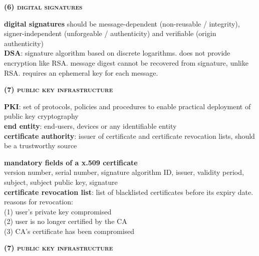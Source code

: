 \documentclass[a4paper]{article}
\begin{document}
\begin{multicols}{2}
\begin{framed}
	\begin{center}
		\textbf{\textsc{(6) digital signatures}}
	\end{center}
	
	\noindent
	\textbf{digital signatures} should be message-dependent (non-reusable / integrity), signer-independent (unforgeable / authenticity) and verifiable (origin authenticity)\\
	
	\noindent
	\textbf{DSA}: signature algorithm based on discrete logarithms. does not provide encryption like RSA. message digest cannot be recovered from signature, unlike RSA. requires an ephemeral key for each message.
\end{framed}

\begin{framed}
	\begin{center}
		\textbf{\textsc{(7) public key infrastructure}}
	\end{center}
	
	\noindent
	\textbf{PKI}: set of protocols, policies and procedures to enable practical deployment of public key cryptography\\
	
	\noindent
	\textbf{end entity}: end-users, devices or any identifiable entity\\
	\textbf{certificate authority}: issuer of certificate and certificate revocation lists, should be a trustworthy source
	
	\noindent
	\textbf{mandatory fields of a x.509 certificate}\\
	version number, serial number, signature algorithm ID, issuer, validity period, subject, subject public key, signature\\
	
	\noindent
	\textbf{certificate revocation list}: list of blacklisted certificates before its expiry date. reasons for revocation:\\
	(1) user's private key compromised\\
	(2) user is no longer certified by the CA\\
	(3) CA's certificate has been compromised
\end{framed}

\begin{framed}
	\begin{center}
		\textbf{\textsc{(7) public key infrastructure}}
	\end{center}
	

\end{framed}
\end{multicols}
\end{document}
